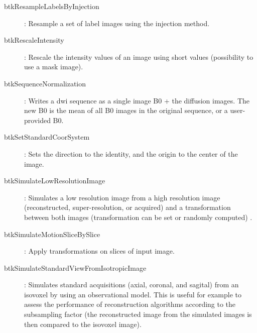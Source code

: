 \begin{description}
\item[btkResampleLabelsByInjection]: Resample a set of label images using the injection method.
\item[btkRescaleIntensity]: Rescale the intensity values of an image using short values (possibility to use a mask image).
\item[btkSequenceNormalization]: Writes a dwi sequence as a single image B0 + the diffusion images. The new B0 is the mean of all B0 images in the original sequence, or a user-provided B0.
\item[btkSetStandardCoorSystem]: Sets the direction to the identity, and the origin to the center of the image.
\item[btkSimulateLowResolutionImage]: Simulates a low resolution image from a high resolution image (reconstructed, super-resolution, or acquired) and a transformation between both images (transformation can be set or randomly computed)
.%
\item[btkSimulateMotionSliceBySlice]: Apply transformations on slices of input image.
\item[btkSimulateStandardViewFromIsotropicImage]: Simulates standard acquisitions (axial, coronal, and sagital) from an isovoxel by using an observational model. This is useful for example to assess the performance of reconstruction algorithms according to the subsampling factor (the reconstructed image from the simulated images is then compared to the isovoxel image). 

\end{description}
